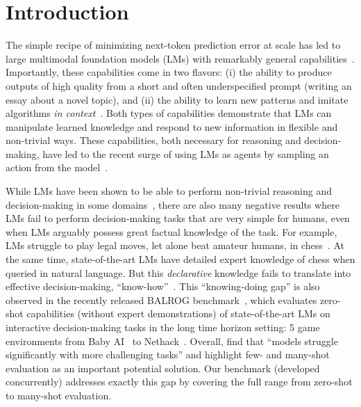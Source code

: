 \section{Introduction}
\label{sec:introduction}

The simple recipe of minimizing next-token prediction error at scale has led to large multimodal foundation models (LMs) with remarkably general capabilities~\citep{openai2023gpt4, anil2023gemini, anthropic2024claude3}.
Importantly, these capabilities come in two flavors: (i) the ability to produce outputs of high quality from a short and often underspecified prompt (\eg writing an essay about a novel topic), and (ii) the ability to learn new patterns and imitate algorithms \emph{in context}~\citep{reid2024gemini, mirchandani2023large}.
Both types of capabilities demonstrate that LMs
can manipulate learned knowledge and respond to new information in flexible and non-trivial ways.
These capabilities, both necessary for reasoning and decision-making, have led to the recent surge of using LMs as agents by sampling an action from the model~\citep{mirchandani2023large, dipalo2024keypoint}.

While LMs have been shown to be able to perform non-trivial reasoning and decision-making in some domains~\citep{ huang2022language,yao2023react,romera2024mathematical}, there are also many negative results where LMs fail to perform decision-making tasks that are very simple for humans, even when LMs arguably possess great factual knowledge of the task.
For example, LMs struggle to play legal moves, let alone beat amateur humans, in chess~\citep{carlini2023playing}.
At the same time, state-of-the-art LMs have detailed expert knowledge of chess when queried in natural language. But this \emph{declarative} knowledge fails to translate into effective decision-making, \ie ``know-how''~\citep{ryle1949concept}.
This ``knowing-doing gap'' is also observed in the recently released BALROG benchmark~\citep{paglieri2025balrog}, which evaluates zero-shot capabilities (\ie without expert demonstrations) of state-of-the-art LMs on interactive decision-making tasks in the long time horizon setting: 5 game environments from Baby AI~\citep{chevalier2019babyai} to Nethack~\citep{kuttler2020nethack}.
Overall, \citet{paglieri2025balrog} find that ``models struggle significantly with more challenging tasks'' and highlight few- and many-shot evaluation as an important potential solution.
Our benchmark (developed concurrently) addresses exactly this gap by covering the full range from zero-shot to many-shot evaluation.

